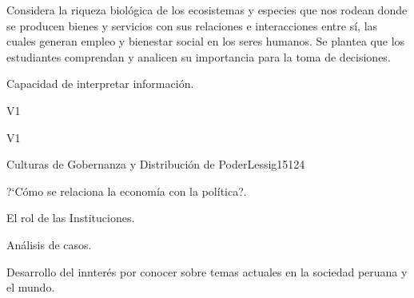 \begin{syllabus}


\begin{justification}
Considera la riqueza biológica de los ecosistemas y especies que nos rodean donde se producen bienes y servicios con sus relaciones e interacciones entre sí, las cuales generan empleo y bienestar social en los seres humanos. Se plantea que los estudiantes comprendan y analicen su importancia para la toma de decisiones. 
\end{justification}

\begin{goals}
\item Capacidad de interpretar información.
\end{goals}

\begin{outcomes}{V1}
    \item {}
    \item {}
    \item {}
    
\end{outcomes}

\begin{competences}{V1}
    \item {}
    \item {}
    \item {}
    \item {}
\end{competences}

\begin{unit}{Culturas de Gobernanza y Distribución de Poder}{}{Lessig15}{12}{4}
   \begin{topics}
      \item ?`Cómo se relaciona la economía con la política?.
      \item El rol de las Instituciones.
      \item Análisis de casos.
   \end{topics}
   \begin{learningoutcomes}
      \item Desarrollo del innterés por conocer sobre temas actuales en la sociedad peruana y el mundo.
   \end{learningoutcomes}
\end{unit}

\begin{coursebibliography}
\end{coursebibliography}

\end{syllabus}
